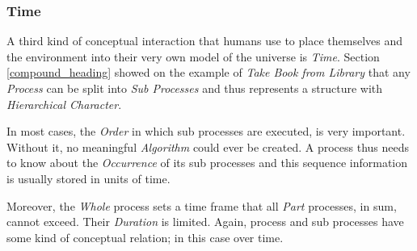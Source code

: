 %
%
%
%
%
%
%

\subsubsection{Time}
\label{time_heading}

A third kind of conceptual interaction that humans use to place themselves and
the environment into their very own model of the universe is \emph{Time}. Section
\ref{compound_heading} showed on the example of \emph{Take Book from Library}
that any \emph{Process} can be split into \emph{Sub Processes} and thus
represents a structure with \emph{Hierarchical Character}.

In most cases, the \emph{Order} in which sub processes are executed, is very
important. Without it, no meaningful \emph{Algorithm} could ever be created.
A process thus needs to know about the \emph{Occurrence} of its sub processes
and this sequence information is usually stored in units of time.

Moreover, the \emph{Whole} process sets a time frame that all \emph{Part}
processes, in sum, cannot exceed. Their \emph{Duration} is limited. Again,
process and sub processes have some kind of conceptual relation; in this case
over time.

